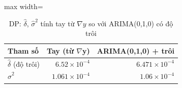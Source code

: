 \begin{table}[H]
\centering\footnotesize
\caption{DP: $\hat\delta$, $\hat\sigma^2$ tính tay từ $\nabla y$ so với ARIMA(0,1,0) có độ trôi}\label{tab:tab_b12_05_rw_manual_vs_arima}
\begin{adjustbox}{max width=\linewidth}
\begin{tabular}{|l|r|r|}
\toprule
Tham số & Tay (từ $\nabla$y) & ARIMA(0,1,0) + trôi \\
\midrule
$\hat{\delta}$ (độ trôi) & $6.52\times10^{-4}$ & $6.471\times10^{-4}$ \\
$\hat{\sigma}^{2}$ & $1.061\times10^{-4}$ & $1.06\times10^{-4}$ \\
\bottomrule
\end{tabular}
\end{adjustbox}
\end{table}
